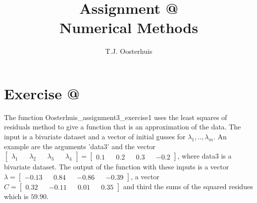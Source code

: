 \documentclass[12pt]{article}
\makeatletter
\newcommand*{\rom}[1]{\expandafter\@slowromancap\romannumeral #1@}
\makeatother
\begin{document}
 
 
\title{Assignment \rom{3} \\
\large Numerical Methods} 
\author{T.J. Oosterhuis}
\maketitle
%
\section*{Exercise \rom{1}}
The function Oosterhuis\_assignment3\_exercise1 uses the least squares of residuals method to give a function that is an approximation of the data. The input is a bivariate dataset and a vector of initial gusses for $\lambda_1,..,\lambda_m.$ An example are the arguments 'data3' and the vector $\begin{bmatrix} \lambda_1 && \lambda_2 && \lambda_3 && \lambda_4 \end{bmatrix} =  \begin{bmatrix} 0.1 && 0.2 && 0.3 && -0.2 \end{bmatrix}$, where data3 is a bivariate dataset. The output of the function with these inputs is a vector $\lambda = \begin{bmatrix} -0.13 && 0.84 && -0.86 && -0.39 \end{bmatrix}$, a vector $C = \begin{bmatrix} 0.32 && -0.11 && 0.01 && 0.35 \end{bmatrix}$  and third the sums of the squared residues which is $59.90$.
\end{document}
